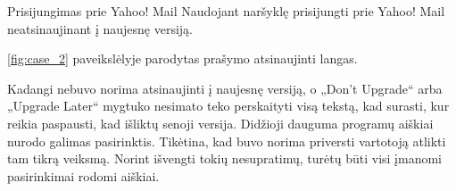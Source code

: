 ﻿\begin{xcase}{Prisijungimas prie Yahoo! Mail}
  \xcgoal
  {
    Naudojant naršyklę prisijungti prie Yahoo! Mail neatsinaujinant į naujesnę versiją.
  }
  \xctools
  {
    \ref{fig:case_2} paveikslėlyje parodytas prašymo atsinaujinti langas.

  }
  \xcresult
  {
    Kadangi nebuvo norima atsinaujinti į naujesnę versiją, o „Don't Upgrade“  arba „Upgrade Later“ mygtuko nesimato teko perskaityti visą tekstą, kad surasti, kur reikia paspausti, kad išliktų senoji versija.
  }
  \xcprinciples
  {
	{
	  Didžioji dauguma programų aiškiai nurodo galimas pasirinktis.
	}
  }
  \xcthoughts
  {
    Tikėtina, kad buvo norima priversti vartotoją atlikti tam tikrą veiksmą. Norint išvengti tokių nesupratimų, turėtų būti visi įmanomi pasirinkimai rodomi aiškiai.
  }
\end{xcase}